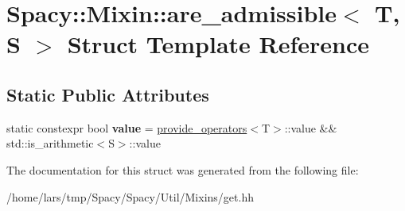 \hypertarget{structSpacy_1_1Mixin_1_1are__admissible}{}\section{Spacy\+:\+:Mixin\+:\+:are\+\_\+admissible$<$ T, S $>$ Struct Template Reference}
\label{structSpacy_1_1Mixin_1_1are__admissible}
\subsection*{Static Public Attributes}
\begin{DoxyCompactItemize}
\item 
static constexpr bool {\bfseries value} = \hyperlink{structSpacy_1_1Mixin_1_1provide__operators}{provide\+\_\+operators}$<$T$>$\+::value \&\& std\+::is\+\_\+arithmetic$<$S$>$\+::value\hypertarget{structSpacy_1_1Mixin_1_1are__admissible_aaa90aad2cda1088017cdf772c939c88d}{}\label{structSpacy_1_1Mixin_1_1are__admissible_aaa90aad2cda1088017cdf772c939c88d}

\end{DoxyCompactItemize}


The documentation for this struct was generated from the following file\+:\begin{DoxyCompactItemize}
\item 
/home/lars/tmp/\+Spacy/\+Spacy/\+Util/\+Mixins/get.\+hh\end{DoxyCompactItemize}
